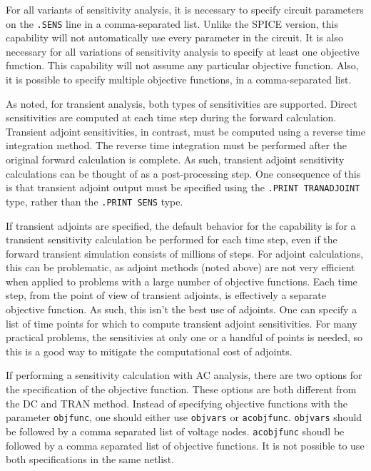 \begin{Command}
For all variants of sensitivity analysis, it is necessary to specify 
circuit parameters on the \texttt{.SENS} line in a comma-separated list.  Unlike the SPICE version, 
this capability will not automatically use every parameter in the circuit.
It is also necessary for all variations of sensitivity analysis to specify at least 
one objective function.  This capability will not assume any particular 
objective function.  Also, it is possible to specify multiple
objective functions, in a comma-separated list.

As noted, for transient analysis, both types of sensitivities are supported.
Direct sensitivities are computed at each time step during the forward 
calculation.  Transient adjoint sensitivities, in contrast, must be computed
using a reverse time integration method.  The reverse time integration must be 
performed after the original forward calculation is complete.  As such, transient 
adjoint sensitivity calculations can be thought of as a post-processing step.  
One consequence of this is that transient adjoint output must be specified using 
the \texttt{.PRINT TRANADJOINT} type, rather than the \texttt{.PRINT SENS} 
type.

If transient adjoints are specified, the default behavior for the capability is 
for a transient sensitivity calculation be performed for each time step, even 
if the forward transient simulation consists of millions of steps.  For adjoint 
calculations, this can be problematic, as adjoint methods (noted above) are not 
very efficient when applied to problems with a large number of objective functions.
Each time step, from the point of view of transient adjoints, is effectively a 
separate objective function.  As such, this isn't the best use of adjoints.  
One can specify  a list of time points for which to compute transient adjoint
sensitivities. For many practical problems, the sensitivies at only one or a 
handful of points is needed, so this is a good way to mitigate the computational 
cost of adjoints.

If performing a sensitivity calculation with AC analysis, 
there are two options for the specification of the 
objective function. These options are both different from the DC and TRAN method.
Instead of specifying objective functions with the parameter \texttt{objfunc},
one should either use \texttt{objvars} or \texttt{acobjfunc}.  
\texttt{objvars} should be followed by a comma separated list of voltage nodes.  
\texttt{acobjfunc} shoudl be followed by a comma separated list of objective functions.  
It is not possible to use both specifications in the same netlist.

\end{Command}
